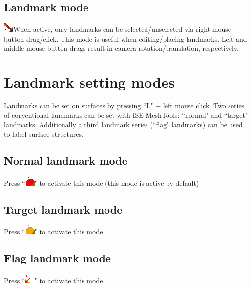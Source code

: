 \subsection{Landmark mode}
  \includegraphics[scale=0.7]{images/pixmap/Landmarks2.png}When active, only landmarks can be selected/unselected via right mouse button drag/click. This mode is useful when editing/placing landmarks. Left and middle mouse button drags result in camera rotation/translation, respectively.

\section{Landmark setting modes}
Landmarks can be set on surfaces by pressing ``L" + left mouse click. 
Two series of conventional landmarks can be set with ISE-MeshTools: ``normal" and ``target" landmarks. Additionally a third landmark series (``flag" landmarks) can be used to label surface structures. 
\subsection{Normal landmark mode}	
Press ``\includegraphics[scale=0.7]{images/pixmap/Landmarks4.png}" to activate this mode (this mode is active by default)
\subsection{Target landmark mode}	

Press ``\includegraphics[scale=0.7]{images/pixmap/Landmarks6.png}"  to activate this mode
\subsection{Flag landmark mode}	

Press ``\includegraphics[scale=0.7]{images/pixmap/Flag01.png}" to activate this mode
